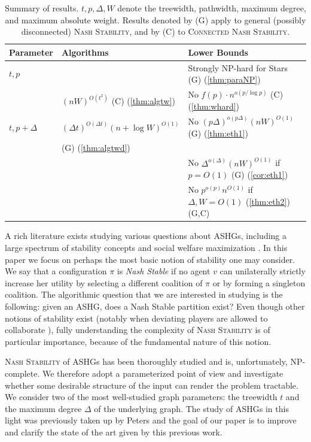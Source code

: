 \documentclass[letterpaper,USenglish,cleveref, autoref, thm-restate]{lipics-v2021}
\begin{document}
\begin{table}
\begin{tabular}{|l|l|l|} 
\hline
Parameter & Algorithms & Lower Bounds \\
\hline
$t,p$ &  & Strongly NP-hard for Stars (G) (\cref{thm:paraNP})\\
                    & $(nW)^{O(t^2)}$ (C) (\cref{thm:algtw})& No $f(p)\cdot n^{o(p/\log p)}$ (C) (\cref{thm:whard})\\
\hline
$t,p+\Delta$ & $\left(\Delta
t\right)^{O(\Delta t)} (n+\log W)^{O(1)}$ &  No $(p\Delta)^{o(p\Delta)}(nW)^{O(1)}$ (G) (\cref{thm:eth1})\\
 & (G)  (\cref{thm:algtwd})&  \\
 & & No $\Delta^{o(\Delta)}(nW)^{O(1)}$ if $p=O(1)$  (G) (\cref{cor:eth1})\\
 & & No $p^{o(p)}n^{O(1)}$ if $\Delta,W=O(1)$ (\cref{thm:eth2}) (G,C) \\
\hline
\end{tabular} \caption{Summary of results. $t,p,\Delta,W$ denote the treewidth,
pathwidth, maximum degree, and maximum absolute weight. Results denoted by (G)
apply to general (possibly disconnected) \textsc{Nash Stability}, and by (C) to
\textsc{Connected Nash Stability}.}\label{tbl:summary} \end{table}

A rich literature exists studying various questions about ASHGs, including a
large spectrum of stability concepts and social welfare maximization
\cite{AzizBS13,Ballester04,ElkindFF20,FlamminiKMZ21,HanakaKMO19,Olsen09,OlsenBT12,SungD10}.
In this paper we focus on perhaps the most basic notion of stability one may
consider.  We say that a configuration $\pi$ is \emph{Nash Stable} if no agent
$v$ can unilaterally strictly increase her utility by selecting a different
coalition of $\pi$ or by forming a singleton coalition.  The algorithmic
question that we are interested in studying is the following: given an ASHG,
does a Nash Stable partition exist? Even though other notions of stability
exist (notably when deviating players are allowed to collaborate
\cite{BranzeiL09,DeinekoW13,Peters17,Woeginger13}), fully understanding the
complexity of \textsc{Nash Stability} is of particular importance, because of
the fundamental nature of this notion.

\textsc{Nash Stability} of ASHGs has been thoroughly studied and is,
unfortunately, NP-complete. We therefore adopt a parameterized point of view
and investigate whether some desirable structure of the input can render the
problem tractable.  We consider two of the most well-studied graph parameters:
the treewidth $t$ and the maximum degree $\Delta$ of the underlying graph. The
study of ASHGs in this light was previously taken up by Peters \cite{Peters16a}
and the goal of our paper is to improve and clarify the state of the art given
by this previous work.
\end{document}
